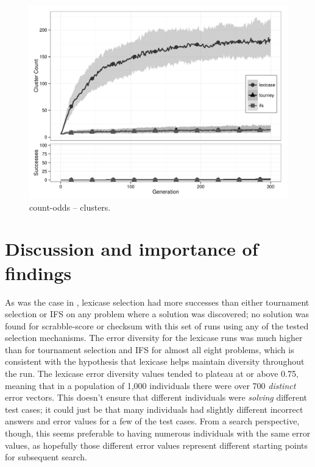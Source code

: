 \begin{figure}[p] %
\centering
\includegraphics[width=11.5cm]{count-odds-cluster.pdf}
\caption{count-odds -- clusters.}
\label{count-oddsClu}
\end{figure}


\section{Discussion and importance of findings}
\label{sec:discussion}

As was the case in \cite{Helmuth:2015:GECCO}, lexicase selection had more successes than 
either tournament selection or IFS on any problem where a solution was discovered; no solution
was found for scrabble-score or checksum with this set of runs using any of the tested 
selection mechanisms. The error diversity for the lexicase runs was much higher than for tournament
selection and IFS for almost all eight problems, which is consistent with the hypothesis that
lexicase helps maintain diversity throughout the run. The lexicase error diversity values tended to
plateau at or above 0.75, meaning that in a population of 1,000 individuals there were over 700
\emph{distinct} error vectors. This doesn't ensure that different individuals were \emph{solving}
different test cases; it could just be that many individuals had slightly different incorrect
answers and error values for a few of the test cases. From a search perspective, though, this seems
preferable to having numerous individuals with the same error values, as hopefully those different
error values represent different starting points for subsequent search.

